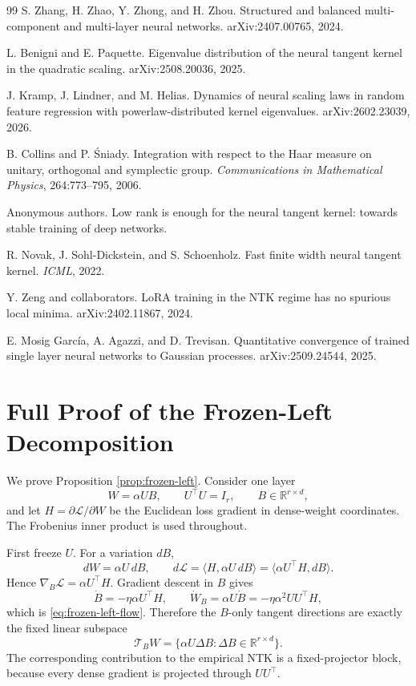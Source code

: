 \documentclass{article}
\newcommand{\R}{\mathbb R}
\begin{document}
\begin{thebibliography}{99}
S. Zhang, H. Zhao, Y. Zhong, and H. Zhou.
\newblock Structured and balanced multi-component and multi-layer neural networks.
\newblock arXiv:2407.00765, 2024.

L. Benigni and E. Paquette.
\newblock Eigenvalue distribution of the neural tangent kernel in the quadratic scaling.
\newblock arXiv:2508.20036, 2025.

J. Kramp, J. Lindner, and M. Helias.
\newblock Dynamics of neural scaling laws in random feature regression with powerlaw-distributed kernel eigenvalues.
\newblock arXiv:2602.23039, 2026.

B. Collins and P. \'Sniady.
\newblock Integration with respect to the Haar measure on unitary, orthogonal and symplectic group.
\newblock \emph{Communications in Mathematical Physics}, 264:773--795, 2006.

Anonymous authors.
\newblock Low rank is enough for the neural tangent kernel: towards stable training of deep networks.

R. Novak, J. Sohl-Dickstein, and S. Schoenholz.
\newblock Fast finite width neural tangent kernel.
\newblock \emph{ICML}, 2022.

Y. Zeng and collaborators.
\newblock LoRA training in the NTK regime has no spurious local minima.
\newblock arXiv:2402.11867, 2024.

E. Mosig García, A. Agazzi, and D. Trevisan.
\newblock Quantitative convergence of trained single layer neural networks to Gaussian processes.
\newblock arXiv:2509.24544, 2025.
\end{thebibliography}

\appendix

\section{Full Proof of the Frozen-Left Decomposition}
\label{app:frozen-left-full-proof}
We prove Proposition \ref{prop:frozen-left}. Consider one layer
\[
W=\alpha UB,\qquad U^\top U=I_r,\qquad B\in\R^{r\times d},
\]
and let \(H=\partial \mathcal L/\partial W\) be the Euclidean loss gradient in dense-weight coordinates. The Frobenius inner product is used throughout.

First freeze \(U\). For a variation \(dB\),
\[
dW=\alpha U\,dB,
\qquad
d\mathcal L
=\langle H,\alpha U\,dB\rangle
=\langle \alpha U^\top H,dB\rangle.
\]
Hence \(\nabla_B\mathcal L=\alpha U^\top H\). Gradient descent in \(B\) gives
\[
\dot B=-\eta\alpha U^\top H,
\qquad
\dot W_B=\alpha U\dot B
=-\eta\alpha^2UU^\top H,
\]
which is \eqref{eq:frozen-left-flow}. Therefore the \(B\)-only tangent directions are exactly the fixed linear subspace
\[
\mathcal T_B W=\{\alpha U\Delta B:\Delta B\in\R^{r\times d}\}.
\]
The corresponding contribution to the empirical NTK is a fixed-projector block, because every dense gradient is projected through \(UU^\top\).
\end{document}
